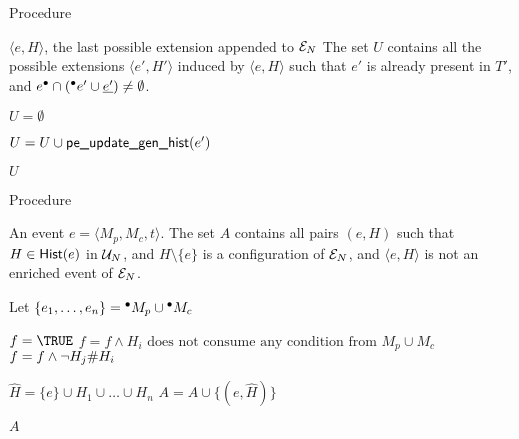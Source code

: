 \begin{algorithm}
\caption{Procedure \peupdatexisting}
\label{alg:pe.updatexisting}

\begin{algorithmic}
\REQUIRE $\langle e, H \rangle$, the last possible extension appended to $\mathcal{E}_{N}$
\ENSURE The set $U$ contains all the possible extensions $\langle e', H'
\rangle$ induced by $\langle e, H \rangle$ such that $e'$ is already present in
$T'$, and $e^\bullet \cap ({}^\bullet e' \cup \underline{e'}) \neq \emptyset$.

\STATE $U = \emptyset$

\STATE $U = U \cup \mbox{\sf pe\_update\_gen\_hist} (e')$

\ENDFOR
\RETURN $U$

\end{algorithmic}
\end{algorithm}

\begin{algorithm}
\caption{Procedure \peupdategenhist}
\label{alg:pe.updategenhist}

\begin{algorithmic}
\REQUIRE An event $e = \langle M_p, M_c, t \rangle$.
\ENSURE The set $A$ contains all pairs $(e, H)$ such that $H \in \mathsf{Hist}(e)$ in
$\mathcal{U}_{N}$, and $H \setminus \{e\}$ is a configuration of $\mathcal{E}_{N}$, and $\langle
e, H \rangle$ is not an enriched event of $\mathcal{E}_{N}$.

\STATE Let $\{e_1, \ldots, e_n\} = {}^\bullet M_p \cup {}^\bullet M_c$

\STATE $f = \TRUE$
\STATE $f = f \land H_i \mbox{ does not consume any condition from } M_p \cup
M_c$
\STATE $f = f \land \lnot H_j \mathord{\#} H_i$
\ENDFOR
\ENDFOR

\STATE $\widehat H = \{e\} \cup H_1 \cup \ldots \cup H_n$
\STATE $A = A \cup \{(e, \widehat H)\}$
\ENDIF
\ENDFOR

\RETURN $A$

\end{algorithmic}
\end{algorithm}


